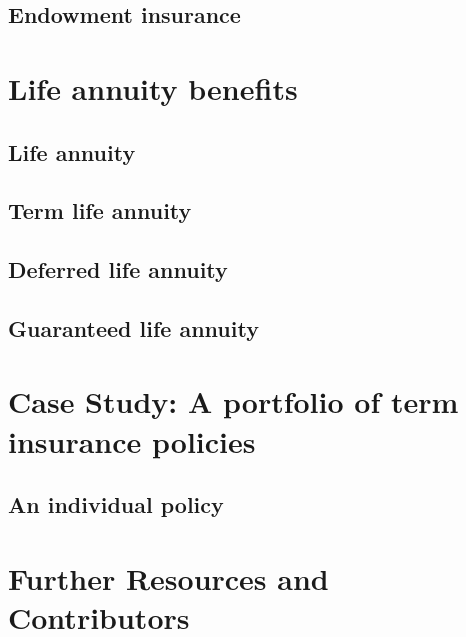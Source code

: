 \documentclass[
]{book}
\begin{document}
\hypertarget{endowment-insurance}{%
\subsection{Endowment insurance}\label{endowment-insurance}}

\hypertarget{Sec:BenefitAnnuity}{%
\section{Life annuity benefits}\label{Sec:BenefitAnnuity}}

\hypertarget{life-annuity}{%
\subsection{Life annuity}\label{life-annuity}}

\hypertarget{term-life-annuity}{%
\subsection{Term life annuity}\label{term-life-annuity}}

\hypertarget{deferred-life-annuity}{%
\subsection{Deferred life annuity}\label{deferred-life-annuity}}

\hypertarget{guaranteed-life-annuity}{%
\subsection{Guaranteed life annuity}\label{guaranteed-life-annuity}}

\hypertarget{Sec:BenefitCS}{%
\section{Case Study: A portfolio of term insurance policies}\label{Sec:BenefitCS}}

\hypertarget{Sec:BenefitCSInd}{%
\subsection{An individual policy}\label{Sec:BenefitCSInd}}

\hypertarget{further-resources-and-contributors}{%
\section{Further Resources and Contributors}\label{further-resources-and-contributors}}
\end{document}
